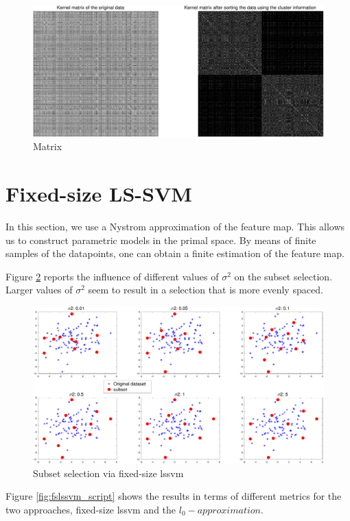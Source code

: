\documentclass[11pt, a4paper]{article}
\begin{document}
\begin{figure}[H]
  \centering
  \includegraphics[scale=.35]{scluster_matrix.pdf}
  \caption{Matrix}
  \label{fig:sclustering_matrix}
\end{figure}

\section{Fixed-size LS-SVM}

In this section, we use a Nystrom approximation of the feature
map. This allows us to construct parametric models in the primal
space. By means of finite samples of the datapoints, one can obtain a
finite estimation of the feature map.

Figure \ref{fig:fslssvm_sig2} reports the influence of different
values of $\sigma^2$ on the subset selection. Larger values of
$\sigma^2$ seem to result in a selection that is more evenly spaced.

\begin{figure}[H]
  \centering
  \includegraphics[scale=.35]{fslssvm_sig2.pdf}
  \caption{Subset selection via fixed-size lssvm}
  \label{fig:fslssvm_sig2}
\end{figure}

Figure \ref{fig:fslssvm_script} shows the results in terms of
different metrics for the two approaches, fixed-size lssvm and the
$l_0-approximation$.
\end{document}
